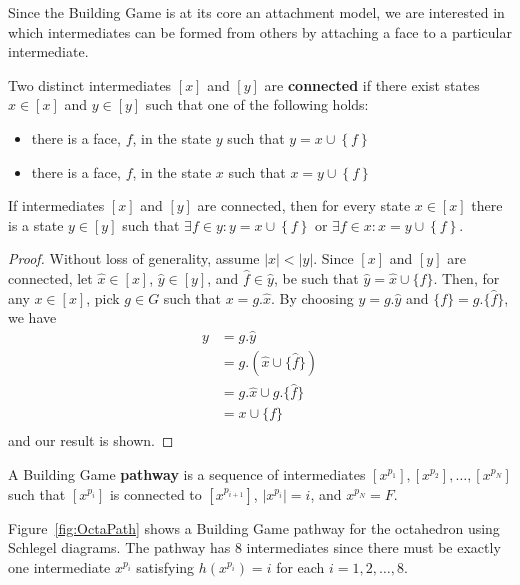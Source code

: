 Since the Building Game is at its core an attachment model, we are interested in which intermediates can be formed from others by attaching a face to a particular intermediate.
\begin{mydef}
Two distinct intermediates $\left[x\right]$ and $\left[y\right]$ are \textbf{connected} if there exist states $x \in \left[x\right]$ and $y \in \left[y\right]$ such that one of the following holds:
\begin{itemize}
 \item there is a face, $f$, in the state $y$ such that $y = x \cup \left\{f\right\}$
 \item there is a face, $f$, in the state $x$ such that $x = y \cup \left\{f\right\}$
\end{itemize}
\end{mydef}

\begin{mylem}
If intermediates $\left[x\right]$ and $\left[y\right]$ are connected, then for every state $x \in \left[x\right]$ there is a state $y \in \left[y\right]$ such that $\exists f \in y: y = x \cup \left\{f\right\}$ or $\exists f \in x: x = y \cup \left\{f\right\}$.
\end{mylem}
\begin{proof}
  Without loss of generality, assume $|x| < |y|$. Since $[x]$ and $[y]$ are connected, let $\hat{x} \in [x]$, $\hat{y} \in [y]$, and $\hat{f} \in \hat{y}$, be such that $\hat{y} = \hat{x}\cup\{\hat{f}\}$. Then, for any $x \in [x]$, pick $g \in G$ such that $x = g.\hat{x}$. By choosing $y = g.\hat{y}$ and $\{f\} = g.\{\hat{f}\}$, we have
\begin{align}
  y &= g.\hat{y} \\
  &= g.(\hat{x}\cup\{\hat{f}\}) \\
  &= g.\hat{x}\cup g.\{\hat{f}\} \\
  &= x \cup \{f\} \\
\end{align}    
and our result is shown.
\end{proof}


\begin{mydef}
A Building Game \textbf{pathway} is a sequence of intermediates $[x^{p_1}], [x^{p_2}], \dots, [x^{p_N}]$ such that  $[x^{p_i}]$ is connected to $[x^{p_{i+1}}]$, $|x^{p_i}| = i$, and $x^{p_N} = F$.
\end{mydef}

 Figure~\ref{fig:OctaPath} shows a Building Game pathway for the octahedron using Schlegel diagrams. The pathway has $8$ intermediates since there must be exactly one intermediate $x^{p_i}$ satisfying $h\left(x^{p_i}\right) = i$ for each $i = 1,2,\dots,8$.

